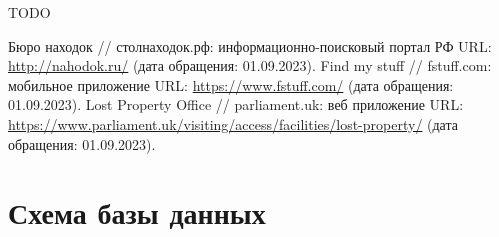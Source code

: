 \documentclass{mirea}
\begin{document}

TODO



\begin{thebibliography}{99\kern\bibindent}
	 Бюро находок // столнаходок.рф: информационно-поисковый портал РФ URL: \url{http://nahodok.ru/} (дата обращения: 01.09.2023).
	 Find my stuff // fstuff.com: мобильное приложение URL: \url{https://www.fstuff.com/} (дата обращения: 01.09.2023).
	 Lost Property Office // parliament.uk: веб приложение URL: \url{https://www.parliament.uk/visiting/access/facilities/lost-property/} (дата обращения: 01.09.2023).
\end{thebibliography}



\appendix

\section{Схема базы данных}
\end{document}
